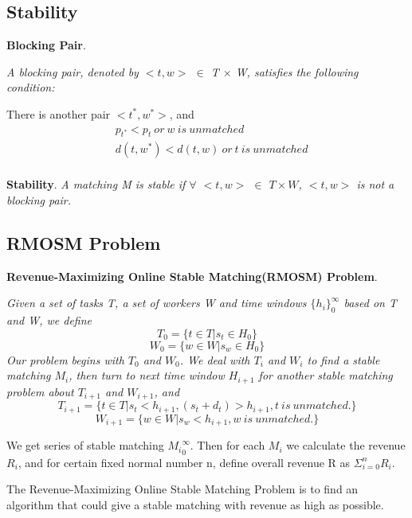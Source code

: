 \documentclass[color,twoside,amssymb,twocolumn]{article}
\begin{document}
\subsection{Stability\cite{gale1962college}}

\textbf{Blocking Pair}. {\it A blocking pair, denoted by $< t, w >$ $\in$ T $\times$ W, satisfies the following condition:
	
	There is another pair $< t^ *, w^ * >$, and
	\begin{equation}
	\begin{split}	
	&p_{t^*} < p_t\ or\ w\ is\ unmatched\\
	&d(t,w^*) < d(t,w)\ or\ t\ is\ unmatched\\
	\end{split}
	\end{equation}
}

\noindent \textbf{Stability}. {\it A matching M is stable if $\forall$ $< t, w >$ $\in$ $T \times W$, $< t, w >$ is not a blocking pair.}

\subsection{RMOSM Problem}
\noindent \textbf{Revenue-Maximizing Online Stable Matching(RMOSM) Problem}. {\it Given a set of tasks T, a set of workers W and time windows $\{h_i\}_{0}^{\infty}$ based on T and W, we define
	\begin{equation}
	T_0=\{t\in T|s_t \in H_0\}
	\end{equation}
	\begin{equation}
	W_0=\{w\in W|s_w \in H_0\}
	\end{equation}
	Our problem begins with $T_0$ and $W_0$. We deal with $T_i$ and $W_i$ to find a stable matching $M_i$, then turn to next time window $H_{i+1}$ for another stable matching problem about $T_{i+1}$ and $W_{i+1}$, and
	\begin{equation}
	T_{i+1}=\{t\in T|s_t<h_{i+1},(s_t+d_t)>h_{i+1},t\ is\ unmatched.\}
	\end{equation}
	\begin{equation}
	W_{i+1}=\{w\in W|s_w<h_{i+1},w\ is\ unmatched.\}
	\end{equation}
	
We get series of stable matching ${M_i}_0^{\infty}$. Then for each $M_i$ we calculate the revenue $R_i$, and for certain fixed normal number n, define overall revenue R as $\Sigma_{i=0}^{n}R_i$. }

The Revenue-Maximizing Online Stable Matching Problem is to find an algorithm that could give a stable matching with revenue as high as possible. 
\end{document}
